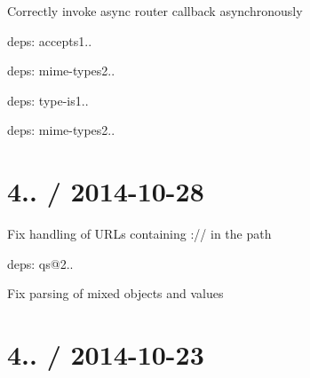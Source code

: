 \begin{DoxyItemize}
\item Correctly invoke async router callback asynchronously
\item deps\+: accepts1..
\begin{DoxyItemize}
\item deps\+: mime-\/types2..
\end{DoxyItemize}
\item deps\+: type-\/is1..
\begin{DoxyItemize}
\item deps\+: mime-\/types2..
\end{DoxyItemize}
\end{DoxyItemize}

\section*{4.. / 2014-\/10-\/28 }


\begin{DoxyItemize}
\item Fix handling of U\+R\+Ls containing {\ttfamily \+://} in the path
\item deps\+: qs@2..
\begin{DoxyItemize}
\item Fix parsing of mixed objects and values
\end{DoxyItemize}
\end{DoxyItemize}

\section*{4.. / 2014-\/10-\/23 }


